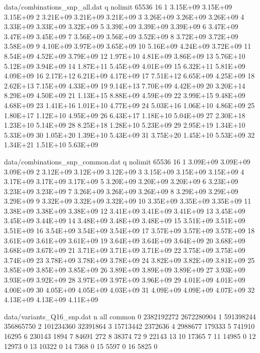 \begin{filecontents}{data/combinations_snp_all.dat}
q	nolimit	65536	16
1	3.15E+09	3.15E+09	3.15E+09
2	3.21E+09	3.21E+09	3.21E+09
3	3.26E+09	3.26E+09	3.26E+09
4	3.33E+09	3.33E+09	3.32E+09
5	3.39E+09	3.39E+09	3.39E+09
6	3.47E+09	3.47E+09	3.45E+09
7	3.56E+09	3.56E+09	3.52E+09
8	3.72E+09	3.72E+09	3.58E+09
9	4.10E+09	3.97E+09	3.65E+09
10	5.16E+09	4.24E+09	3.72E+09
11	8.54E+09	4.52E+09	3.79E+09
12	1.97E+10	4.81E+09	3.86E+09
13	5.76E+10	5.12E+09	3.94E+09
14	1.87E+11	5.45E+09	4.01E+09
15	6.32E+11	5.81E+09	4.09E+09
16	2.17E+12	6.21E+09	4.17E+09
17	7.51E+12	6.65E+09	4.25E+09
18	2.62E+13	7.15E+09	4.33E+09
19	9.14E+13	7.70E+09	4.42E+09
20	3.20E+14	8.29E+09	4.50E+09
21	1.13E+15	8.88E+09	4.59E+09
22	3.99E+15	9.48E+09	4.68E+09
23	1.41E+16	1.01E+10	4.77E+09
24	5.03E+16	1.06E+10	4.86E+09
25	1.80E+17	1.12E+10	4.95E+09
26	6.43E+17	1.18E+10	5.04E+09
27	2.30E+18	1.23E+10	5.14E+09
28	8.25E+18	1.28E+10	5.23E+09
29	2.95E+19	1.34E+10	5.33E+09
30	1.05E+20	1.39E+10	5.43E+09
31	3.75E+20	1.45E+10	5.53E+09
32	1.34E+21	1.51E+10	5.63E+09
\end{filecontents}

\begin{filecontents}{data/combinations_snp_common.dat}
q	nolimit	65536	16
1	3.09E+09	3.09E+09	3.09E+09
2	3.12E+09	3.12E+09	3.12E+09
3	3.15E+09	3.15E+09	3.15E+09
4	3.17E+09	3.17E+09	3.17E+09
5	3.20E+09	3.20E+09	3.20E+09
6	3.23E+09	3.23E+09	3.23E+09
7	3.26E+09	3.26E+09	3.26E+09
8	3.29E+09	3.29E+09	3.29E+09
9	3.32E+09	3.32E+09	3.32E+09
10	3.35E+09	3.35E+09	3.35E+09
11	3.38E+09	3.38E+09	3.38E+09
12	3.41E+09	3.41E+09	3.41E+09
13	3.45E+09	3.45E+09	3.44E+09
14	3.48E+09	3.48E+09	3.48E+09
15	3.51E+09	3.51E+09	3.51E+09
16	3.54E+09	3.54E+09	3.54E+09
17	3.57E+09	3.57E+09	3.57E+09
18	3.61E+09	3.61E+09	3.61E+09
19	3.64E+09	3.64E+09	3.64E+09
20	3.68E+09	3.68E+09	3.67E+09
21	3.71E+09	3.71E+09	3.71E+09
22	3.75E+09	3.75E+09	3.74E+09
23	3.78E+09	3.78E+09	3.78E+09
24	3.82E+09	3.82E+09	3.81E+09
25	3.85E+09	3.85E+09	3.85E+09
26	3.89E+09	3.89E+09	3.89E+09
27	3.93E+09	3.93E+09	3.92E+09
28	3.97E+09	3.97E+09	3.96E+09
29	4.01E+09	4.01E+09	4.00E+09
30	4.05E+09	4.05E+09	4.03E+09
31	4.09E+09	4.09E+09	4.07E+09
32	4.13E+09	4.13E+09	4.11E+09

\end{filecontents}

\begin{filecontents}{data/variants_Q16_snp.dat}
n	all	common
0	2382192272	2672280904
1	591398244	356865750
2	101234360	32391864
3	15713442	2372636
4	2988677	179333
5	741910	16295
6	230143	1894
7	84691	272
8	38374	72
9	22143	13
10	17365	7
11	14985	0
12	12973	0
13	10322	0
14	7368	0
15	5597	0
16	5825	0
\end{filecontents}


